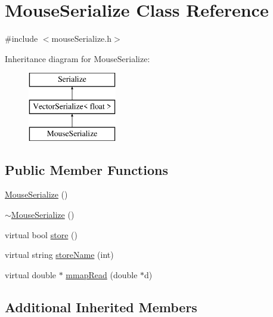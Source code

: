 \hypertarget{classMouseSerialize}{\section{Mouse\-Serialize Class Reference}
\label{classMouseSerialize}
}


{\ttfamily \#include $<$mouse\-Serialize.\-h$>$}

Inheritance diagram for Mouse\-Serialize\-:\begin{figure}[H]
\begin{center}
\leavevmode
\includegraphics[height=3.000000cm]{classMouseSerialize}
\end{center}
\end{figure}
\subsection*{Public Member Functions}
\begin{DoxyCompactItemize}
\item 
\hyperlink{classMouseSerialize_a93c473c5f51988dd5c6b76d6421ac100}{Mouse\-Serialize} ()
\item 
\hyperlink{classMouseSerialize_a09b6c1b866ff0a0999b860677f88d2c4}{$\sim$\-Mouse\-Serialize} ()
\item 
virtual bool \hyperlink{classMouseSerialize_acfe8874b5ea2c2e4a2f235b7b97780e8}{store} ()
\item 
virtual string \hyperlink{classMouseSerialize_a93bdbce909f27855fd2e8eb6edbf75a0}{store\-Name} (int)
\item 
virtual double $\ast$ \hyperlink{classMouseSerialize_ab919e98d4daf8a068fc68741a4a4dcb7}{mmap\-Read} (double $\ast$d)
\end{DoxyCompactItemize}
\subsection*{Additional Inherited Members}


